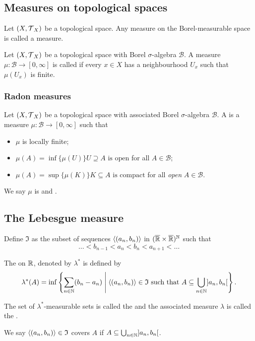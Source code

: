\subsection{Measures on topological spaces}
\begin{definition}
Let $\left( X, \operatorname{\mathcal{T}}_X \right)$ be a topological space. Any measure on the Borel-measurable space is called a  measure. 
\end{definition}


\begin{definition}
Let $\left( X, \operatorname{\mathcal{T}}_X \right)$ be a topological space with Borel $\sigma$-algebra $\mathcal{B}$. A measure $\mu: \mathcal{B} \to [0,\infty]$ is called  if every $x\in X$ has a neighbourhood $U_x$ such that $\mu(U_x)$ is finite.
\end{definition}

\subsubsection{Radon measures}
\begin{definition}
Let $\left( X, \operatorname{\mathcal{T}}_X \right)$ be a topological space with associated Borel $\sigma$-algebra $\mathcal{B}$. A  is a measure $\mu: \mathcal{B}\to [0,\infty]$ such that
\begin{itemize}
\item $\mu$ is locally finite;
\item $\mu(A) = \inf\{\mu(U)\}{\text{$U\supseteq A$ is open}}$ for all $A\in \mathcal{B}$;
\item $\mu(A) = \sup\{\mu(K)\}{\text{$K\subseteq A$ is compact}}$ for all \emph{open} $A\in \mathcal{B}$.
\end{itemize}
We say $\mu$ is  and .
\end{definition}

\subsection{The Lebesgue measure}
\begin{definition}
Define $\mathfrak{I}$ as the subset of sequences $\left\langle (a_n,b_n) \right\rangle$ in $(\overline{\mathbb{R}}\times\overline{\mathbb{R}})^{\mathbb{N}}$ such that
\[ \ldots < b_{n-1}< a_n < b_n < a_{n+1} < \ldots \]

The  on $\mathbb{R}$, denoted by $\lambda^*$ is defined by
\[ \lambda^*(A) = \inf\left\{ \sum_{n\in \mathbb{N}}(b_n-a_n) \;\middle|\; \text{$\left\langle (a_n,b_n) \right\rangle\in \mathfrak{I}$ such that $A \subseteq \bigcup_{n\in\mathbb{N}} ]a_n, b_n[$} \right\}. \]

The set of $\lambda^*$-measurable sets is called the  and the associated measure $\lambda$ is called the .
\end{definition}
We say $\left\langle (a_n,b_n) \right\rangle\in \mathfrak{I}$ covers $A$ if $A \subseteq \bigcup_{n\in\mathbb{N}} ]a_n, b_n[$.

